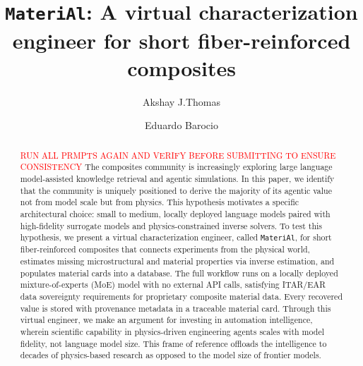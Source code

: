 \documentclass[preprint,review,10pt,number]{elsarticle}
\begin{document}
\begin{frontmatter}
\title{\texttt{MateriAl}: A virtual characterization engineer for short fiber-reinforced composites}


\author[MECH,CMSC]{Akshay J.Thomas }
\address[MECH]{School of Mechanical Engineering, Purdue University, West Lafayette, IN, 47907}
\address[CMSC]{Composites Manufacturing and Simulation Center, Purdue University, West Lafayette, IN 47906}
\address[AERO]{School of Aeronautics and Astronautics, Purdue University, West Lafayette, IN, 47907}
\author[MECH,CMSC]{Eduardo Barocio}



\begin{abstract}
\textcolor{red}{RUN ALL PRMPTS AGAIN AND VERIFY BEFORE SUBMITTING TO ENSURE CONSISTENCY}
The composites community is increasingly exploring large language model-assisted knowledge retrieval and agentic simulations.
In this paper, we identify that the community is uniquely positioned to derive the majority of its agentic value not from model scale but from physics. 
This hypothesis motivates a specific architectural choice: small to medium, locally deployed language models paired with high-fidelity surrogate models and physics-constrained inverse solvers.
To test this hypothesis, we present a virtual characterization engineer, called \texttt{MateriAl}, for short fiber-reinforced composites that connects experiments from the physical world, estimates missing microstructural and material properties via inverse estimation, and populates material cards into a database.
The full workflow runs on a locally deployed mixture-of-experts (MoE) model with no external API calls, satisfying ITAR/EAR data sovereignty requirements for proprietary composite material data. Every recovered value is stored with provenance metadata in a traceable material card. 
Through this virtual engineer, we make an argument for investing in automation intelligence, wherein scientific capability in physics-driven engineering agents scales with model fidelity, not language model size.
This frame of reference offloads the intelligence to decades of physics-based research as opposed to the model size of frontier models.


\end{abstract}


\begin{keyword}


\end{keyword}
\end{frontmatter}
\end{document}
